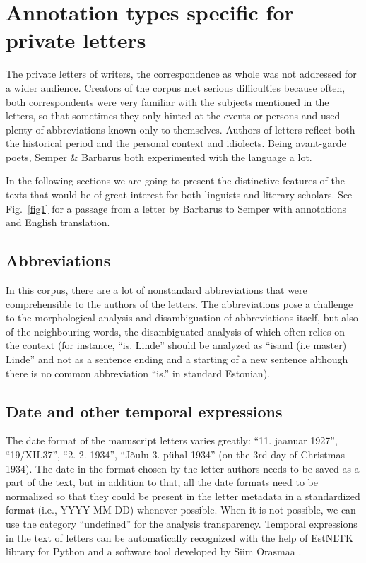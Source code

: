 \documentclass[runningheads]{llncs}
\begin{document}
\section{Annotation types specific for private letters}

The private letters of writers, the correspondence as whole was not addressed for a wider audience. Creators of the corpus met serious difficulties because often, both correspondents were very familiar with the subjects mentioned in the letters, so that sometimes they only hinted at the events or persons and used plenty of abbreviations known only to themselves. Authors of letters reflect both the historical period and the personal context and idiolects. Being avant-garde poets, Semper \& Barbarus both experimented with the language a lot. 

In the following sections we are going to present the distinctive features of the texts that would be of great interest for both linguists and literary scholars.  See Fig.~\ref{fig1} for a passage from a letter by Barbarus to Semper with annotations and English translation.

\subsection{Abbreviations}

In this corpus, there are a lot of nonstandard abbreviations that were comprehensible to the authors of the letters. The abbreviations pose a challenge to the morphological analysis and disambiguation of abbreviations itself, but also of the neighbouring words, the disambiguated analysis of which often relies on the context (for instance, ``is. Linde'' should be analyzed as ``isand (i.e master) Linde'' and not as a sentence ending and a starting of a new sentence although there is no common abbreviation ``is.'' in standard Estonian). 

\subsection{Date and other temporal expressions}

The date format of the manuscript letters varies greatly: ``11. jaanuar 1927'', ``19/XII.37'', ``2. 2. 1934'', ``J\~oulu 3. p\"uhal 1934'' (on the 3rd day of Christmas 1934). The date in the format chosen by the letter authors needs to be saved as a part of the text, but in addition to that, all the date formats need to be normalized so that they could be present in the letter metadata in a standardized format (i.e., YYYY-MM-DD) whenever possible. When it is not possible, we can use the category ``undefined'' for the analysis transparency. Temporal expressions in the text of letters can be automatically recognized with the help of EstNLTK library for Python \cite{ORASMAA16.332} and a software tool developed by Siim Orasmaa \cite{ORASMAA14.530}. 
\end{document}
